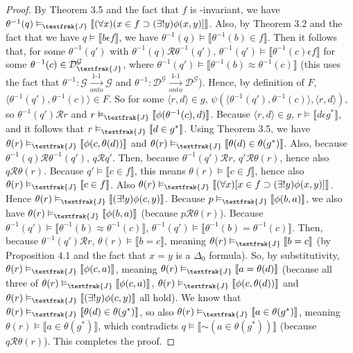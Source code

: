 \documentclass{article}
\newcommand*{\oldneg}{\mathord{\sim}}
\newcommand{\lbc}{\llbracket}
\newcommand{\rbc}{\rrbracket}
\theoremstyle{definition}
\begin{document}
\begin{proof}
By Theorem 3.5 and the fact that $f$ is -invariant, we have 
$\theta^{-1}(q)\vDash_\textfrak{J}\lbc(\forall x)(x\in f\supset(\exists !y)\phi(x,y)]\rbc$. Also, by Theorem 3.2 and the fact that we have 
$q\vDash\lbc b\epsilon f\rbc$, we have $\theta^{-1}(q)\vDash\lbc\theta^{-1}(b)\in f\rbc$. Then it follows that, for some 
$\theta^{-1}(q')$ with $\theta^{-1}(q)\mathcal{R}\theta^{-1}(q')$, 
$\theta^{-1}(q')\vDash\lbc\theta^{-1}(c)\epsilon f\rbc$ for some $\theta^{-1}(c)\in\mathcal{D}^\mathcal{G}_\textfrak{J}$, where 
$\theta^{-1}(q')\vDash\lbc\theta^{-1}(b)\approx\theta^{-1}(c)\rbc$ (this uses the fact that 
$\theta^{-1}:\mathcal{G}\xrightarrow[onto]{\text{1-1}}\mathcal{G}$ and
$\theta^{-1}:\mathcal{D}^\mathcal{G}\xrightarrow[onto]{\text{1-1}}\mathcal{D}^\mathcal{G}$). Hence, by definition of $F$,
$\langle\theta^{-1}(q'),\theta^{-1}(c)\rangle\in F$. So for some $\langle r,d\rangle\in g$, 
$\psi(\langle\theta^{-1}(q'),\theta^{-1}(c)\rangle,\langle r,d\rangle)$, so $\theta^{-1}(q')\mathcal{R}r$ and 
$r\vDash_\textfrak{J}\lbc\phi(\theta^{-1}(c),d)\rbc$. Because $\langle r,d\rangle\in g$, 
$r\vDash\lbc d\epsilon g^*\rbc$, and it follows that 
$r\vDash_\textfrak{J}\lbc d\in g^*\rbc$. Using Theorem 3.5, we have
$\theta(r)\vDash_\textfrak{J}\lbc\phi(c,\theta(d))\rbc$ and $\theta(r)\vDash_\textfrak{J}\lbc\theta(d)\in\theta(g^*)\rbc$. Also,
because $\theta^{-1}(q)\mathcal{R}\theta^{-1}(q')$, $q\mathcal{R}q'$. Then, because $\theta^{-1}(q')\mathcal{R}r$, 
$q'\mathcal{R}\theta(r)$, hence also $q\mathcal{R}\theta(r)$. Because $q'\vDash\lbc c\in f\rbc$, this means
$\theta(r)\vDash\lbc c\in f\rbc$, hence also $\theta(r)\vDash_\textfrak{J}\lbc c\in f\rbc$. Also 
$\theta(r)\vDash_\textfrak{J}\lbc(\forall x)[x\in f\supset(\exists !y)\phi(x,y)]\rbc$. Hence 
$\theta(r)\vDash_\textfrak{J}\lbc(\exists !y)\phi(c,y)\rbc$. Because 
$p\vDash_\textfrak{J}\lbc\phi(b,a)\rbc$, we also have 
$\theta(r)\vDash_\textfrak{J}\lbc\phi(b,a)\rbc$ (because $p\mathcal{R}\theta(r)$). 
Because $\theta^{-1}(q')\vDash\lbc\theta^{-1}(b)\approx\theta^{-1}(c)\rbc$, 
$\theta^{-1}(q')\vDash\lbc\theta^{-1}(b)=\theta^{-1}(c)\rbc$. Then, because $\theta^{-1}(q')\mathcal{R}r$,
$\theta(r)\vDash\lbc b=c\rbc$, meaning $\theta(r)\vDash_\textfrak{J}\lbc b=c\rbc$ (by Proposition 4.1 and the fact that 
$x=y$ is a $\Delta_0$ formula). So, by substitutivity,
$\theta(r)\vDash_\textfrak{J}\lbc\phi(c,a)\rbc$, meaning
$\theta(r)\vDash_\textfrak{J}\lbc a=\theta(d)\rbc$ (because all three of
$\theta(r)\vDash_\textfrak{J}\lbc\phi(c,a)\rbc$, $\theta(r)\vDash_\textfrak{J}\lbc\phi(c,\theta(d))\rbc$ and 
$\theta(r)\vDash_\textfrak{J}\lbc(\exists !y)\phi(c,y)\rbc$ all hold). We know that 
$\theta(r)\vDash_\textfrak{J}\lbc\theta(d)\in\theta(g^*)\rbc$, so also
$\theta(r)\vDash_\textfrak{J}\lbc a\in\theta(g^*)\rbc$, meaning
$\theta(r)\vDash\lbc a\in\theta(g^*)\rbc$, which contradicts 
$q\vDash\lbc\oldneg(a\in\theta(g^*))\rbc$ (because $q\mathcal{R}\theta(r)$). This completes the proof.

\end{proof}
\end{document}
